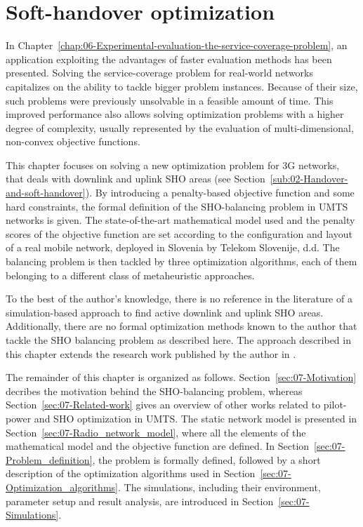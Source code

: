 
\chapter{Soft-handover optimization \label{chap:07-Experimental-evaluation-the-SHO-alignment-problem}}


\noindent In Chapter~\ref{chap:06-Experimental-evaluation-the-service-coverage-problem},
an application exploiting the advantages of faster evaluation methods
has been presented. Solving the service-coverage problem for real-world
networks capitalizes on the ability to tackle bigger problem instances.
Because of their size, such problems were previously unsolvable in
a feasible amount of time. This improved performance also allows solving
optimization problems with a higher degree of complexity, usually
represented by the evaluation of multi-dimensional, non-convex objective
functions.

\noindent This chapter focuses on solving a new optimization problem
for 3G networks, that deals with downlink and uplink SHO areas (see
Section~\ref{sub:02-Handover-and-soft-handover}). By introducing
a penalty-based objective function and some hard constraints, the
formal definition of the SHO-balancing problem in UMTS networks is
given. The state-of-the-art mathematical model used and the penalty
scores of the objective function are set according to the configuration
and layout of a real mobile network, deployed in Slovenia by Telekom
Slovenije, d.d. The balancing problem is then tackled by three optimization
algorithms, each of them belonging to a different class of metaheuristic
approaches.

To the best of the author's knowledge, there is no reference in the
literature of a simulation-based approach to find active downlink
and uplink SHO areas. Additionally, there are no formal optimization
methods known to the author that tackle the SHO balancing problem
as described here. The approach described in this chapter extends
the research work published by the author in \cite{Benedicic_Balancing_downlink_uplink_soft_handover_areas_in_UMTS_networks:2012}.

The remainder of this chapter is organized as follows. Section~\ref{sec:07-Motivation}
decribes the motivation behind the SHO-balancing problem, whereas
Section~\ref{sec:07-Related-work} gives an overview of other works
related to pilot-power and SHO optimization in UMTS. The static network
model is presented in Section~\ref{sec:07-Radio_network_model},
where all the elements of the mathematical model and the objective
function are defined. In Section~\ref{sec:07-Problem_definition},
the problem is formally defined, followed by a short description of
the optimization algorithms used in Section~\ref{sec:07-Optimization_algorithms}.
The simulations, including their environment, parameter setup and
result analysis, are introduced in Section~\ref{sec:07-Simulations}.


